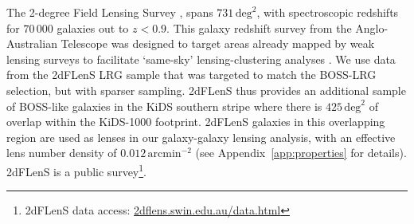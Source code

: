 The 2-degree Field Lensing Survey
\citep[2dFLenS,][]{blake/etal:2016}, spans $731\,\mathrm{deg}^{2}$, with
spectroscopic redshifts for $70\,000$ galaxies out to $z<0.9$.   This
galaxy redshift survey from the Anglo-Australian Telescope was designed
to target areas already mapped by weak lensing surveys to facilitate `same-sky'
lensing-clustering analyses
\citep{johnson/etal:2017,amon/etal:2018,joudaki/etal:2018, blake/etal:2020}.
We use data from the 2dFLenS LRG sample that was targeted to match
the BOSS-LRG selection, but with sparser sampling.  2dFLenS
thus provides an additional sample of BOSS-like galaxies in the KiDS
southern stripe where there is $425\,\mathrm{deg}^{2}$ of overlap within
the KiDS-1000 footprint.  2dFLenS galaxies in this overlapping region are used as lenses in
our galaxy-galaxy lensing analysis, with an effective lens number density of $0.012\,\mathrm{arcmin}^{-2}$ (see Appendix~\ref{app:properties} for details).  2dFLenS is a public survey\footnote{2dFLenS data
  access: \href{http://2dflens.swin.edu.au/data.html}{2dflens.swin.edu.au/data.html}}.   

